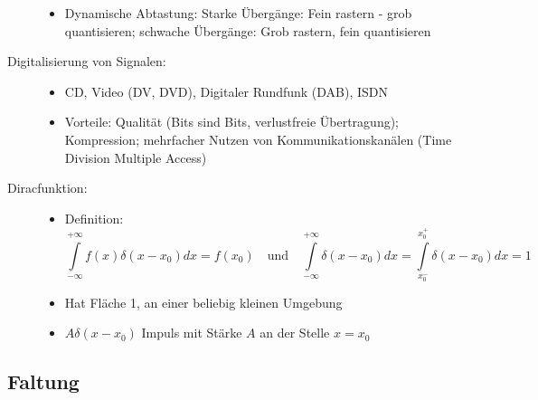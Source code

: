 \begin{description}
\begin{itemize}
\item Dynamische Abtastung: Starke Übergänge: Fein rastern - grob quantisieren; schwache Übergänge: Grob rastern, fein quantisieren
\end{itemize}
\item[Digitalisierung von Signalen:] \quad
\begin{itemize}
\item CD, Video (DV, DVD), Digitaler Rundfunk (DAB), ISDN
\item Vorteile: Qualität (Bits sind Bits, verlustfreie Übertragung); Kompression; mehrfacher Nutzen von Kommunikationskanälen (Time Division Multiple Access)
\end{itemize}
\item[Diracfunktion\index{Diracfunktion}:]\quad
\begin{itemize}
\item Definition: $$\int\limits_{- \infty}^{+ \infty} f(x) \delta(x - x_0) dx = f(x_0) \quad \textrm{und} \quad \int\limits_{- \infty}^{+ \infty} \delta(x - x_0) dx = \int\limits_{x_0^-}^{x_0^+} \delta(x - x_0) dx = 1$$
\item Hat Fläche 1, an einer beliebig kleinen Umgebung
\item $A \delta(x - x_0)$ Impuls mit Stärke $A$ an der Stelle $x = x_0$
\end{itemize}
\end{description}

\subsection{Faltung}

